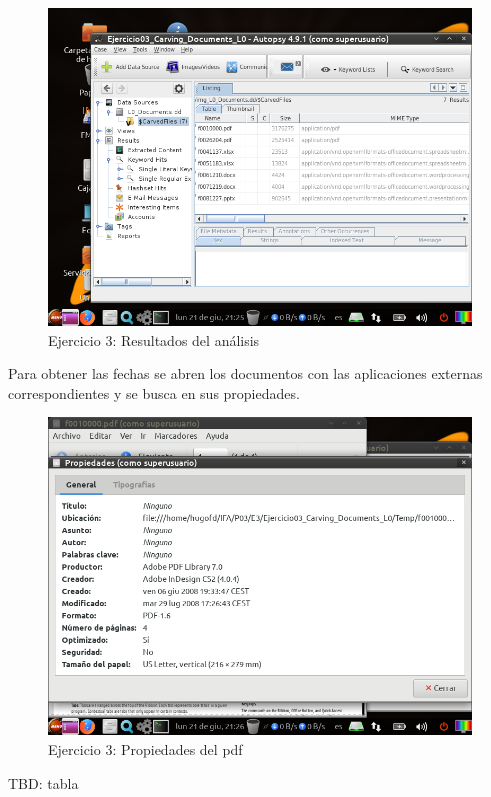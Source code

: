 \documentclass[11pt]{article}
\begin{document}
\begin{figure}[H]
  \caption{Ejercicio 3: Resultados del análisis}
  \centering
  \includegraphics[scale=0.7]{e3-5.png}
\end{figure}

Para obtener las fechas se abren los documentos con las aplicaciones externas correspondientes y se busca en sus propiedades.

\begin{figure}[H]
  \caption{Ejercicio 3: Propiedades del pdf}
  \centering
  \includegraphics[scale=0.7]{e3-6.png}
\end{figure}

TBD: tabla



\begin{thebibliography}{8}
\end{thebibliography}
\end{document}
